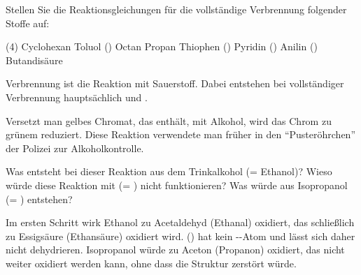 \documentclass[DIV11]{scrartcl}
\begin{document}
\begin{question}[name=Verbrennungsreaktion]
Stellen Sie die Reaktionsgleichungen für die vollständige Verbrennung
folgender Stoffe auf:
\begin{tasks}(4)
  \task Cyclohexan
  \task Toluol ()
  \task Octan
  \task Propan
  \task Thiophen ()
  \task Pyridin ()
  \task Anilin ()
  \task Butandisäure
\end{tasks}
\end{question}
\begin{solution}[name=Verbrennungsreaktion]
Verbrennung ist die Reaktion mit Sauerstoff.  Dabei entstehen bei vollständiger
Verbrennung hauptsächlich  und .
\begin{tasks}
  \task {}
  \task {}
  \task {}
  \task {}
  \task {}
  \task {}
  \task {}
  \task {}
\end{tasks}
\end{solution}
\newpage

\begin{question}[name=Oxidation von Alkoholen]
Versetzt man gelbes Chromat, das  enthält, mit Alkohol,
wird das Chrom zu grünem  reduziert.  Diese Reaktion
verwendete man früher in den "`Pusteröhrchen"' der Polizei zur
Alkoholkontrolle.
\begin{tasks}
  \task Was entsteht bei dieser Reaktion aus dem Trinkalkohol (= Ethanol)?
  \task Wieso würde diese Reaktion mit  (=
    ) nicht funktionieren?
  \task Was würde aus Isopropanol (= ) entstehen?
\end{tasks}
\end{question}
\begin{solution}[name=Oxidation von Alkoholen]
\begin{tasks}
  \task Im ersten Schritt wirk Ethanol zu Acetaldehyd (Ethanal) oxidiert, das
    schließlich zu Essigsäure (Ethansäure) oxidiert wird.
  \task {} () hat kein
    \Chemalpha--Atom und lässt sich daher nicht dehydrieren.
  \task Isopropanol würde zu Aceton (Propanon) oxidiert, das nicht weiter
    oxidiert werden kann, ohne dass die Struktur zerstört würde.
\end{tasks}
\end{solution}
\end{document}
